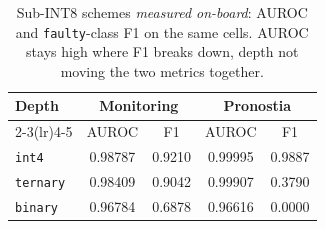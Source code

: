 \begin{table}[htbp]
\centering
\caption{Sub-INT8 schemes \emph{measured on-board}: AUROC and \texttt{faulty}-class F1 on the same cells. AUROC stays high where F1 breaks down, depth not moving the two metrics together.}
\label{tab:depth-board}
\begin{tabular}{lcccc}
\toprule
Depth & \multicolumn{2}{c}{Monitoring} & \multicolumn{2}{c}{Pronostia} \\
\cmidrule(lr){2-3}\cmidrule(lr){4-5}
 & AUROC & F1 & AUROC & F1 \\
\midrule
\texttt{int4} & \num{0.98787} & \num{0.9210} & \num{0.99995} & \num{0.9887} \\
\texttt{ternary} & \num{0.98409} & \num{0.9042} & \num{0.99907} & \num{0.3790} \\
\texttt{binary} & \num{0.96784} & \num{0.6878} & \num{0.96616} & \num{0.0000} \\
\bottomrule
\end{tabular}
\end{table}
